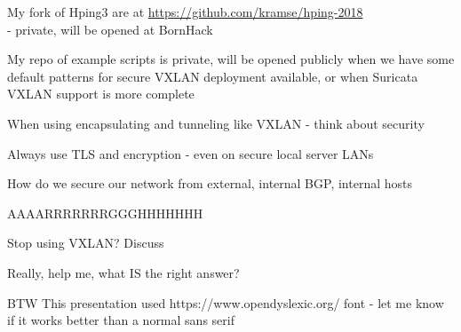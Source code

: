 \documentclass[16pt,landscape,a4paper,footrule]{foils}
\begin{document}
My fork of Hping3 are at \url{https://github.com/kramse/hping-2018}\\
- private, will be opened at BornHack

My repo of example scripts is private, will be opened publicly when we have some default patterns for secure VXLAN deployment available, or when Suricata VXLAN support is more complete



\begin{list2}
\item When using encapsulating and tunneling like VXLAN - think about security
\item Always use TLS and encryption - even on secure local server LANs
\item How do we secure our network from external, internal BGP, internal hosts
\item AAAARRRRRRRGGGHHHHHHH \smiley
\item Stop using VXLAN? Discuss
\end{list2}

\vskip 2cm
Really, help me, what IS the right answer? \smiley

\vskip 2cm
BTW This presentation used https://www.opendyslexic.org/ font - let me know if it works better than a normal sans serif
\end{document}
